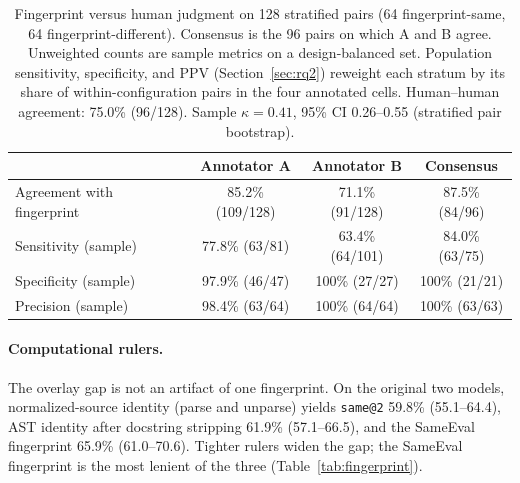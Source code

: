 \documentclass[acmsmall,screen,review,anonymous]{acmart}
\makeatletter
\newcommand{\sameeval}{SameEval}
\newcommand{\sameat}{\mbox{\texttt{same@2}}}
\makeatother
\begin{document}
\begin{table}[t]
  \small
  \caption{Fingerprint versus human judgment on 128 stratified pairs
    (64 fingerprint-same, 64 fingerprint-different).
    Consensus is the 96 pairs on which A and B agree.
    Unweighted counts are sample metrics on a design-balanced set.
    Population sensitivity, specificity, and PPV (Section~\ref{sec:rq2}) reweight each stratum
    by its share of within-configuration pairs in the four annotated cells.
    Human--human agreement: 75.0\% (96/128).
    Sample $\kappa{=}0.41$, 95\% CI 0.26--0.55
    (stratified pair bootstrap).}
  \label{tab:human}
  \begin{tabular}{lccc}
    \toprule
    & Annotator A & Annotator B & Consensus \\
    \midrule
    Agreement with fingerprint & 85.2\% (109/128) & 71.1\% (91/128) & 87.5\% (84/96) \\
    Sensitivity (sample) & 77.8\% (63/81) & 63.4\% (64/101) & 84.0\% (63/75) \\
    Specificity (sample) & 97.9\% (46/47) & 100\% (27/27) & 100\% (21/21) \\
    Precision (sample) & 98.4\% (63/64) & 100\% (64/64) & 100\% (63/63) \\
    \bottomrule
  \end{tabular}
\end{table}

\paragraph{Computational rulers.}
The overlay gap is not an artifact of one fingerprint.
On the original two models, normalized-source identity (parse and unparse) yields
\sameat{} 59.8\% (55.1--64.4), AST identity after docstring stripping 61.9\%
(57.1--66.5), and the \sameeval{} fingerprint 65.9\% (61.0--70.6).
Tighter rulers widen the gap; the \sameeval{} fingerprint is the most lenient
of the three (Table~\ref{tab:fingerprint}).
\end{document}
